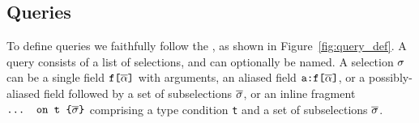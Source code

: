 


\subsection{Queries}\label{subsec:query}
To define queries we faithfully follow the \spec, as shown in
Figure~\ref{fig:query_def}. A query consists of a list of selections, and can optionally be named.
A selection $\sigma$ can be a single field $\texttt{f[}\overline{\alpha}\texttt{]}$ with arguments, an aliased field $\texttt{a:}\texttt{f[}\overline{\alpha}\texttt{]}$, or a possibly-aliased field followed by a set of subselections $\overline{\sigma}$, or an inline fragment $\texttt{... on t \{}\overline{\sigma}\texttt{\}}$ comprising a type condition \texttt{t} and a set of subselections $\overline{\sigma}$. 

